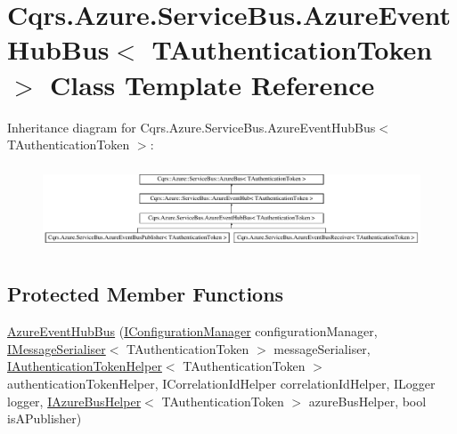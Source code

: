 \hypertarget{classCqrs_1_1Azure_1_1ServiceBus_1_1AzureEventHubBus}{}\section{Cqrs.\+Azure.\+Service\+Bus.\+Azure\+Event\+Hub\+Bus$<$ T\+Authentication\+Token $>$ Class Template Reference}
\label{classCqrs_1_1Azure_1_1ServiceBus_1_1AzureEventHubBus}
Inheritance diagram for Cqrs.\+Azure.\+Service\+Bus.\+Azure\+Event\+Hub\+Bus$<$ T\+Authentication\+Token $>$\+:\begin{figure}[H]
\begin{center}
\leavevmode
\includegraphics[height=2.533937cm]{classCqrs_1_1Azure_1_1ServiceBus_1_1AzureEventHubBus}
\end{center}
\end{figure}
\subsection*{Protected Member Functions}
\begin{DoxyCompactItemize}
\item 
\hyperlink{classCqrs_1_1Azure_1_1ServiceBus_1_1AzureEventHubBus_aef24d23dd76d6bb0f58b582e2abf9872}{Azure\+Event\+Hub\+Bus} (\hyperlink{interfaceCqrs_1_1Configuration_1_1IConfigurationManager}{I\+Configuration\+Manager} configuration\+Manager, \hyperlink{interfaceCqrs_1_1Azure_1_1ServiceBus_1_1IMessageSerialiser}{I\+Message\+Serialiser}$<$ T\+Authentication\+Token $>$ message\+Serialiser, \hyperlink{interfaceCqrs_1_1Authentication_1_1IAuthenticationTokenHelper}{I\+Authentication\+Token\+Helper}$<$ T\+Authentication\+Token $>$ authentication\+Token\+Helper, I\+Correlation\+Id\+Helper correlation\+Id\+Helper, I\+Logger logger, \hyperlink{interfaceCqrs_1_1Azure_1_1ServiceBus_1_1IAzureBusHelper}{I\+Azure\+Bus\+Helper}$<$ T\+Authentication\+Token $>$ azure\+Bus\+Helper, bool is\+A\+Publisher)
\end{DoxyCompactItemize}
